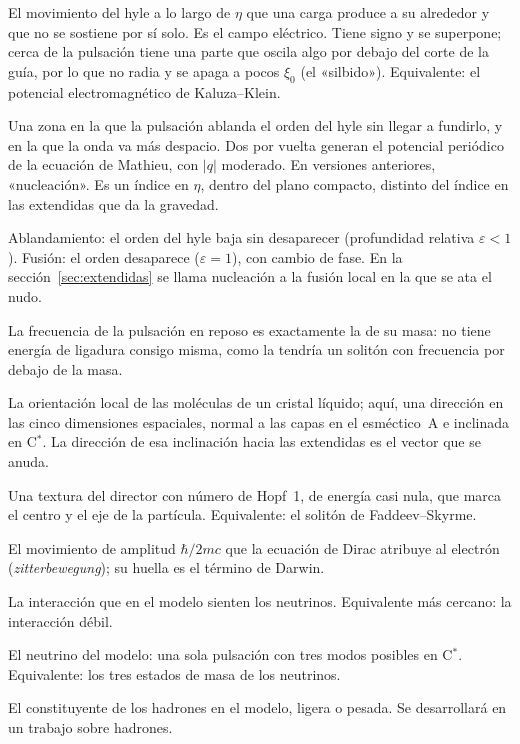 \documentclass[11pt,a4paper]{article}
\newcommand{\Cst}{C\ensuremath{^{*}}}
\begin{document}
\begin{description}[leftmargin=1.5em,style=nextline,itemsep=0.2em]
\item[Arrastre] El movimiento del hyle a lo largo de $\eta$ que una carga produce a su alrededor y que no se sostiene por sí solo. Es el campo eléctrico. Tiene signo y se superpone; cerca de la pulsación tiene una parte que oscila algo por debajo del corte de la guía, por lo que no radia y se apaga a pocos $\xi_0$ (el «silbido»). Equivalente: el potencial electromagnético de Kaluza--Klein.
\item[Zona de mayor índice] Una zona en la que la pulsación ablanda el orden del hyle sin llegar a fundirlo, y en la que la onda va más despacio. Dos por vuelta generan el potencial periódico de la ecuación de Mathieu, con $|q|$ moderado. En versiones anteriores, «nucleación». Es un índice en $\eta$, dentro del plano compacto, distinto del índice en las extendidas que da la gravedad.
\item[Ablandamiento, fusión] Ablandamiento: el orden del hyle baja sin desaparecer (profundidad relativa $\varepsilon<1$). Fusión: el orden desaparece ($\varepsilon=1$), con cambio de fase. En la sección~\ref{sec:extendidas} se llama nucleación a la fusión local en la que se ata el nudo.
\item[Energía de autoenlace nula] La frecuencia de la pulsación en reposo es exactamente la de su masa: no tiene energía de ligadura consigo misma, como la tendría un solitón con frecuencia por debajo de la masa.
\item[Director] La orientación local de las moléculas de un cristal líquido; aquí, una dirección en las cinco dimensiones espaciales, normal a las capas en el esméctico~A e inclinada en \Cst. La dirección de esa inclinación hacia las extendidas es el vector que se anuda.
\item[Nudo, hopfión] Una textura del director con número de Hopf~1, de energía casi nula, que marca el centro y el eje de la partícula. Equivalente: el solitón de Faddeev--Skyrme.
\item[Temblor de Dirac] El movimiento de amplitud $\hbar/2mc$ que la ecuación de Dirac atribuye al electrón (\emph{zitterbewegung}); su huella es el término de Darwin.
\item[Neutrínica] La interacción que en el modelo sienten los neutrinos. Equivalente más cercano: la interacción débil.
\item[Trineutrino] El neutrino del modelo: una sola pulsación con tres modos posibles en \Cst. Equivalente: los tres estados de masa de los neutrinos.
\item[Epícima] El constituyente de los hadrones en el modelo, ligera o pesada. Se desarrollará en un trabajo sobre hadrones.
\end{description}
\end{document}
